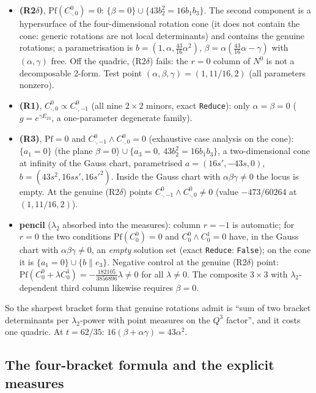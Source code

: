 \documentclass[10pt]{article}
\newcommand{\Pf}{\mathrm{Pf}}
\begin{document}
\begin{itemize}\setlength{\itemsep}{1pt}
\item \textbf{(R2$\delta$)}, $\Pf(C^0_{\cdot,0})=0$: $\{\beta=0\}\cup\{43b_2^2=16b_1b_3\}$. The second component is a hypersurface of the four-dimensional rotation cone (it does not contain the cone: generic rotations are not local determinants) and contains the genuine rotations; a parametrisation is $b=(1,\alpha,\tfrac{43}{16}\alpha^2)$, $\beta=\alpha(\tfrac{43}{16}\alpha-\gamma)$ with $(\alpha,\gamma)$ free. Off the quadric, (R2$\delta$) fails: the $r=0$ column of $N^0$ is not a decomposable 2-form. Test point $(\alpha,\beta,\gamma)=(1,11/16,2)$ (all parameters nonzero).
\item \textbf{(R1)}, $C^0_{\cdot,0}\propto C^0_{\cdot,-1}$ (all nine $2\times2$ minors, exact \texttt{Reduce}): only $\alpha=\beta=0$ ($g=e^{\gamma E_{23}}$, a one-parameter degenerate family).
\item \textbf{(R3)}, $\Pf=0$ and $C^0_{\cdot,-1}\wedge C^0_{\cdot,0}=0$ (exhaustive case analysis on the cone): $\{a_1=0\}$ (the plane $\beta=0$) $\cup\ \{a_3=0,\ 43b_2^2=16b_1b_3\}$, a two-dimensional cone at infinity of the Gauss chart, parametrised $a=(16s',-43s,0)$, $b=(43s^2,16ss',16s'^2)$. Inside the Gauss chart with $\alpha\beta\gamma\neq0$ the locus is empty. At the genuine (R2$\delta$) points $C^0_{\cdot,-1}\wedge C^0_{\cdot,0}\neq0$ (value $-473/60264$ at $(1,11/16,2)$).
\item \textbf{pencil} ($\lambda_2$ absorbed into the measures): column $r=-1$ is automatic; for $r=0$ the two conditions $\Pf(C^0_0)=0$ and $C^0_0\wedge C^1_0=0$ have, in the Gauss chart with $\alpha\beta\gamma\neq0$, an \emph{empty} solution set (exact \texttt{Reduce}: \texttt{False}); on the cone it is $\{a_1=0\}\cup\{b\parallel e_3\}$. Negative control at the genuine (R2$\delta$) point: $\Pf(C^0_0+\lambda C^1_0)=-\tfrac{182105}{3856896}\lambda\neq0$ for all $\lambda\neq0$. The composite $3\times3$ with $\lambda_2$-dependent third column likewise requires $\beta=0$.
\end{itemize}

So the sharpest bracket form that genuine rotations admit is ``sum of two bracket determinants per $\lambda_2$-power with point measures on the $Q^3$ factor'', and it costs one quadric. At $t=62/35$: $16(\beta+\alpha\gamma)=43\alpha^2$.

\subsection{The four-bracket formula and the explicit measures}\label{sec:adjform}
\end{document}
